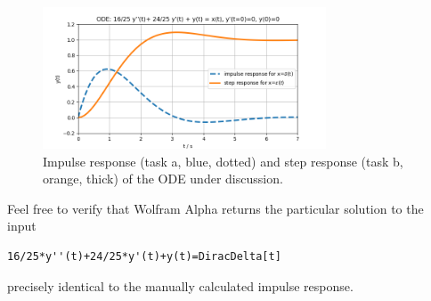 \begin{figure}[h!]
\centering
\includegraphics[width=0.75\textwidth]{../laplace_transform/impulse_step_response}
\caption{Impulse response (task a, blue, dotted) and step response (task b, orange, thick)
of the ODE under discussion.}
\label{fig:impulse_step_response}
\end{figure}

Feel free to verify that Wolfram Alpha returns the particular solution to the
input
\begin{verbatim}
16/25*y''(t)+24/25*y'(t)+y(t)=DiracDelta[t]
\end{verbatim}
precisely identical to the manually calculated impulse response.



